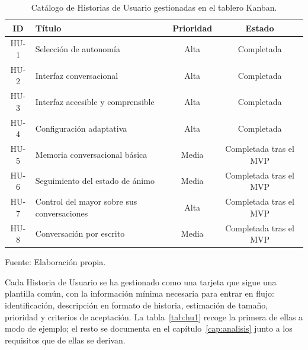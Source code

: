 \begin{table}[htbp]
    \centering
    \caption{Catálogo de Historias de Usuario gestionadas en el tablero Kanban.}
    \label{tab:catalogo-hu}
    \begin{tabularx}{\textwidth}{@{}c >{\RaggedRight\arraybackslash}X c c@{}}
        \toprule
        \textbf{ID} & \textbf{Título} & \textbf{Prioridad} & \textbf{Estado} \\
        \midrule
        HU-1 & Selección de autonomía              & Alta  & Completada \\
        HU-2 & Interfaz conversacional             & Alta  & Completada \\
        HU-3 & Interfaz accesible y comprensible   & Alta  & Completada \\
        HU-4 & Configuración adaptativa            & Alta  & Completada \\
        HU-5 & Memoria conversacional básica       & Media & Completada tras el MVP \\
        HU-6 & Seguimiento del estado de ánimo     & Media & Completada tras el MVP \\
        HU-7 & Control del mayor sobre sus conversaciones & Alta & Completada tras el MVP \\
        HU-8 & Conversación por escrito            & Media & Completada tras el MVP \\
        \bottomrule
    \end{tabularx}

    \vspace{2pt}
    {\footnotesize Fuente: Elaboración propia.}
\end{table}

Cada Historia de Usuario se ha gestionado como una tarjeta que sigue una plantilla común, con la
información mínima necesaria para entrar en flujo: identificación, descripción en formato de historia,
estimación de tamaño, prioridad y criterios de aceptación. La tabla~\ref{tab:hu1} recoge la primera de
ellas a modo de ejemplo; el resto se documenta en el capítulo~\ref{cap:analisis} junto a los requisitos que
de ellas se derivan.

